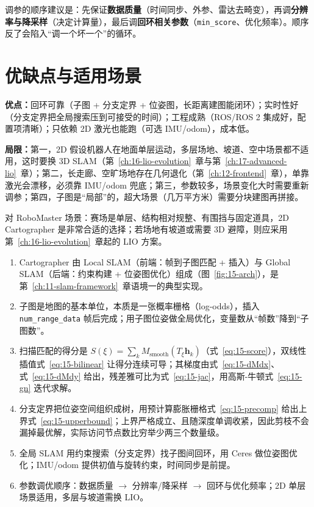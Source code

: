 调参的顺序建议是：先保证\textbf{数据质量}（时间同步、外参、雷达去畸变），再调\textbf{分辨率与降采样}（决定计算量），最后调\textbf{回环相关参数}（\lstinline{min_score}、优化频率）。顺序反了会陷入``调一个坏一个''的循环。

\section{优缺点与适用场景}\label{sec:15-pros}

\textbf{优点：}回环可靠（子图 + 分支定界 + 位姿图，长距离建图能闭环）；实时性好（分支定界把全局搜索压到可接受的时间）；工程成熟（ROS/ROS 2 集成好，配置项清晰）；只依赖 2D 激光也能跑（可选 IMU/odom），成本低。

\textbf{局限：}第一，2D 假设机器人在地面单层运动，多层场地、坡道、空中场景都不适用，这时要换 3D SLAM（第~\ref{ch:16-lio-evolution}~章与第~\ref{ch:17-advanced-lio}~章）；第二，长走廊、空旷场地存在几何退化（第~\ref{ch:12-frontend}~章），单靠激光会漂移，必须靠 IMU/odom 兜底；第三，参数较多，场景变化大时需要重新调参；第四，子图是``局部''的，超大场景（几万平方米）需要分块建图再拼接。

对 RoboMaster 场景：赛场是单层、结构相对规整、有围挡与固定道具，2D Cartographer 是非常合适的选择；若场地有坡道或需要 3D 避障，则应采用第~\ref{ch:16-lio-evolution}~章起的 LIO 方案。

\begin{summary}
\begin{enumerate}
  \item Cartographer 由 Local SLAM（前端：帧到子图匹配 + 插入）与 Global SLAM（后端：约束构建 + 位姿图优化）组成（图~\ref{fig:15-arch}），是第~\ref{ch:11-slam-framework}~章语境一的典型实现。
  \item 子图是地图的基本单位，本质是一张概率栅格（log-odds），插入 \lstinline{num_range_data} 帧后完成；用子图位姿做全局优化，变量数从``帧数''降到``子图数''。
  \item 扫描匹配的得分是 $S(\xi)=\sum_k M_{\mathrm{smooth}}(T_\xi\bm{h}_k)$（式~\eqref{eq:15-score}），双线性插值式~\eqref{eq:15-bilinear} 让得分连续可导；其梯度由式~\eqref{eq:15-dMdx}、式~\eqref{eq:15-dMdy} 给出，残差雅可比为式~\eqref{eq:15-jac}，用高斯-牛顿式~\eqref{eq:15-gn} 迭代求解。
  \item 分支定界把位姿空间组织成树，用预计算膨胀栅格式~\eqref{eq:15-precomp} 给出上界式~\eqref{eq:15-upperbound}；上界严格成立、且随深度单调收紧，因此剪枝不会漏掉最优解，实际访问节点数比穷举少两三个数量级。
  \item 全局 SLAM 用约束搜索（分支定界）找子图间回环，用 Ceres 做位姿图优化；IMU/odom 提供初值与旋转约束，时间同步是前提。
  \item 参数调优顺序：数据质量 $\rightarrow$ 分辨率/降采样 $\rightarrow$ 回环与优化频率；2D 单层场景适用，多层与坡道需换 LIO。
\end{enumerate}


\end{summary}

